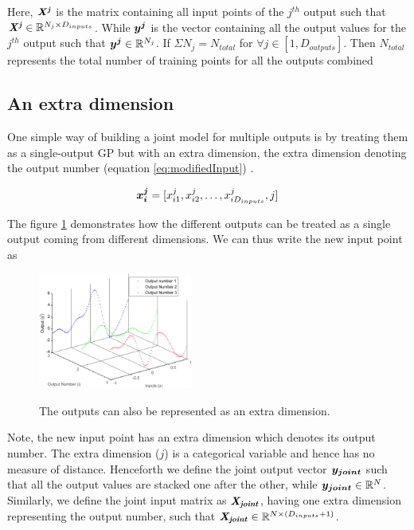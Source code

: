 Here, \(\bm{\mathit{X^j}}\) is the matrix containing all input points of the $j^{th}$ output such that \(\bm{\mathit{X^j}} \in \mathbb{R}^{N_{j} \times D_{inputs}}\). While  \(\boldsymbol{y^{j}}\) is the vector containing all the output values for the \(j^{th}\) output such that \(\boldsymbol{y^{j}} \in \mathbb{R}^{N_{j}}\). If \(\Sigma N_{j} = N_{total}\) for \( \forall  j \in [1, D_{outputs}]\). Then \(N_{total}\) represents the total number of training points for all the outputs combined

\subsection{An extra dimension}\label{subsecAnExtraDimension}
One simple way of building a joint model for multiple outputs is by treating them as a single-output GP but with an extra dimension, the extra dimension denoting the output number (equation \ref{eq:modifiedInput}) \cite{osborne2010bayesian}. 

\begin{equation}\label{eq:modifiedInput}
    \boldsymbol{x_{i}^{j}} = [x_{i1}^{j}, x_{i2}^{j}, \ldots, x_{iD_{inputs}}^{j}, j]
\end{equation}

The figure \ref{figoutputsAsAnExtraDimension} demonstrates how the different outputs can be treated as a single output coming from different dimensions. We can thus write the new input point as

\begin{figure}[!ht]
  \centering
        \includegraphics[width=0.45\textwidth]
        {images/part3/outputsAsAnExtraDimension}
        \label{figoutputsAsAnExtraDimension}
        \caption{The outputs can also be represented as an extra dimension.}
\end{figure}

Note, the new input point has an extra dimension which denotes its output number. The extra dimension ($j$) is a categorical variable and hence has no measure of distance. Henceforth we define the joint output vector \(\boldsymbol{y_{joint}}\) such that all the output values are stacked one after the other, while \(\boldsymbol{y_{joint}} \in \mathbb{R}^{N}\). Similarly, we define the joint input matrix as \(\bm{\mathit{X_{joint}}}\), having one extra dimension representing the output number, such that \(\bm{\mathit{X_{joint}}} \in \mathbb{R}^{N \times (D_{inputs}+1)}\).  

